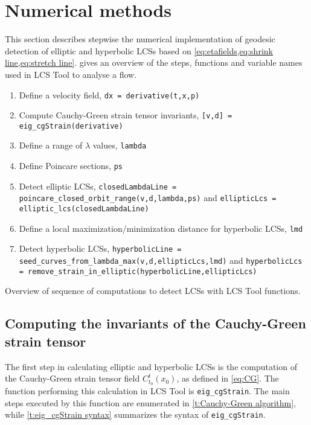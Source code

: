 \documentclass{article}
\begin{document}
\section{Numerical methods}

This section describes stepwise the numerical implementation of geodesic detection of elliptic and hyperbolic LCSs based on \cref{eq:etafields,eq:shrink line,eq:stretch line}.  gives an overview of the steps, functions and variable names used in LCS Tool to analyse a flow.

\begin{table}
\begin{enumerate}
\item Define a velocity field, \lstinline!dx = derivative(t,x,p)!
\item Compute Cauchy-Green strain tensor invariants, \lstinline![v,d] = eig_cgStrain(derivative)!
\item Define a range of $\lambda$ values, \lstinline!lambda!
\item Define Poincare sections, \lstinline!ps!
\item Detect elliptic LCSs, \lstinline!closedLambdaLine = poincare_closed_orbit_range(v,d,lambda,ps)! and \lstinline!ellipticLcs = elliptic_lcs(closedLambdaLine)!
\item Define a local maximization/minimization distance for hyperbolic LCSs, \lstinline!lmd!
\item Detect hyperbolic LCSs, \lstinline!hyperbolicLine = seed_curves_from_lambda_max(v,d,ellipticLcs,lmd)! and \lstinline!hyperbolicLcs = remove_strain_in_elliptic(hyperbolicLine,ellipticLcs)!
\end{enumerate}
\caption{Overview of sequence of computations to detect LCSs with LCS Tool functions.}
\label{t:LCS Tool overview}
\end{table}

\subsection{Computing the invariants of the Cauchy-Green strain tensor}

The first step in calculating elliptic and hyperbolic LCSs is the computation of the Cauchy-Green strain tensor field $C_{t_0}^t(x_0)$, as defined in \cref{eq:CG}. The function performing this calculation in LCS Tool is \lstinline!eig_cgStrain!. The main steps executed by this function are enumerated in \cref{t:Cauchy-Green algorithm}, while \cref{t:eig_cgStrain syntax} summarizes the syntax of \lstinline!eig_cgStrain!.
\end{document}
